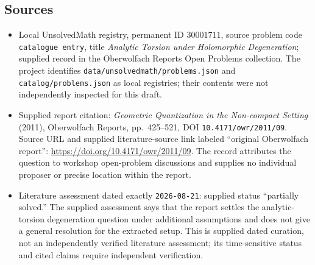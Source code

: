 \documentclass[11pt]{article}
\begin{document}
\subsection{Sources}
\begin{itemize}
\item Local UnsolvedMath registry, permanent ID \(30001711\), source problem code \texttt{catalogue entry}, title \emph{Analytic Torsion under Holomorphic Degeneration}; supplied record in the Oberwolfach Reports Open Problems collection. The project identifies \texttt{data/unsolvedmath/problems.json} and \texttt{catalog/problems.json} as local registries; their contents were not independently inspected for this draft.
\item Supplied report citation: \emph{Geometric Quantization in the Non-compact Setting} (2011), Oberwolfach Reports, pp.\ 425--521, DOI \texttt{10.4171/owr/2011/09}. Source URL and supplied literature-source link labeled ``original Oberwolfach report'': \url{https://doi.org/10.4171/owr/2011/09}. The record attributes the question to workshop open-problem discussions and supplies no individual proposer or precise location within the report.
\item Literature assessment dated exactly \texttt{2026-08-21}: supplied status ``partially solved.'' The supplied assessment says that the report settles the analytic-torsion degeneration question under additional assumptions and does not give a general resolution for the extracted setup. This is supplied dated curation, not an independently verified literature assessment; its time-sensitive status and cited claims require independent verification.
\end{itemize}
\end{document}
